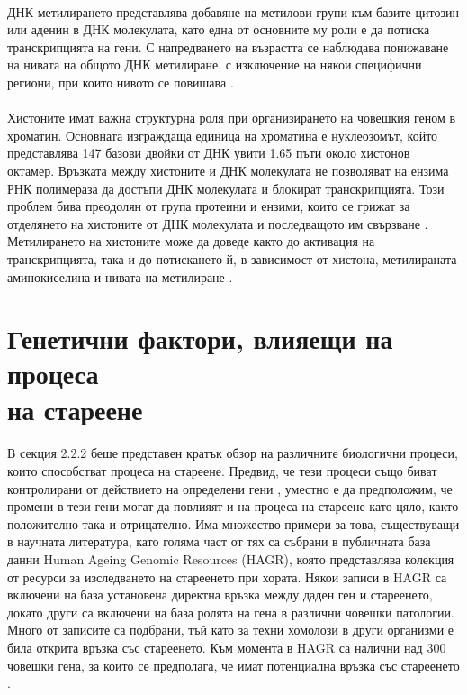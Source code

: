 \documentclass[pdftex,cyrillic,14pt,a4page,twoside,openright]{extreport}
\begin{document}
\paragraph{}
ДНК метилирането представлява добавяне на метилови групи към базите цитозин или аденин в ДНК молекулата, като една от основните му роли е да потиска транскрипцията на гени. С напредването на възрастта се наблюдава понижаване на нивата на общото ДНК метилиране, с изключение на някои специфични региони, при които нивото се повишава \cite{jung2015}.

\paragraph{}
Хистоните имат важна структурна роля при организирането на човешкия геном в хроматин. Основната изграждаща единица на хроматина е нуклеозомът, който представлява 147 базови двойки от ДНК увити 1.65 пъти около хистонов октамер. Връзката между хистоните и ДНК молекулата не позволяват на ензима РНК полимераза да достъпи ДНК молекулата и блокират транскрипцията. Този проблем бива преодолян от група протеини и ензими, които се грижат за отделянето на хистоните от ДНК молекулата и последващото им свързване \cite{das2012}. Метилирането на хистоните може да доведе както до активация на транскрипцията, така и до потискането й, в зависимост от хистона, метилираната аминокиселина и нивата на метилиране \cite{yi2020}.

\section[Генетични фактори, влияещи на процеса на стареене]{Генетични фактори, влияещи на процеса\\ на стареене}
\paragraph{}
В секция 2.2.2 беше представен кратък обзор на различните биологични процеси, които способстват процеса на стареене. Предвид, че тези процеси също биват контролирани от действието на определени гени \cite{liu2004}\cite{jin2018}\cite{tominaga2002}, уместно е да предположим, че промени в тези гени могат да повлияят и на процеса на стареене като цяло, както положително така и отрицателно. Има множество примери за това, съществуващи в научната литература, като голяма част от тях са събрани в публичната база данни Human Ageing Genomic Resources (HAGR), която представлява колекция от ресурси за изследването на стареенето при хората. Някои записи в HAGR са включени на база установена директна връзка между даден ген и стареенето, докато други са включени на база ролята на гена в различни човешки патологии. Много от записите са подбрани, тъй като за техни хомолози в други организми е била открита връзка със стареенето. Към момента в HAGR са налични над 300 човешки гена, за които се предполага, че имат потенциална връзка със стареенето \cite{tacutu2018}.
\end{document}
